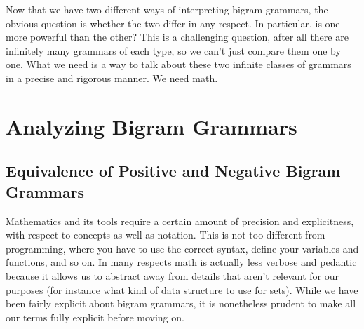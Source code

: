 Now that we have two different ways of interpreting bigram grammars, the obvious question is whether the two differ in any respect.
In particular, is one more powerful than the other?
This is a challenging question, after all there are infinitely many grammars of each type, so we can't just compare them one by one.
What we need is a way to talk about these two infinite classes of grammars in a precise and rigorous manner.
We need math.


\section{Analyzing Bigram Grammars}

\subsection{Equivalence of Positive and Negative Bigram Grammars}

Mathematics and its tools require a certain amount of precision and explicitness, with respect to concepts as well as notation.
This is not too different from programming, where you have to use the correct syntax, define your variables and functions, and so on.
In many respects math is actually less verbose and pedantic because it allows us to abstract away from details that aren't relevant for our purposes (for instance what kind of data structure to use for sets).
While we have been fairly explicit about bigram grammars, it is nonetheless prudent to make all our terms fully explicit before moving on.

